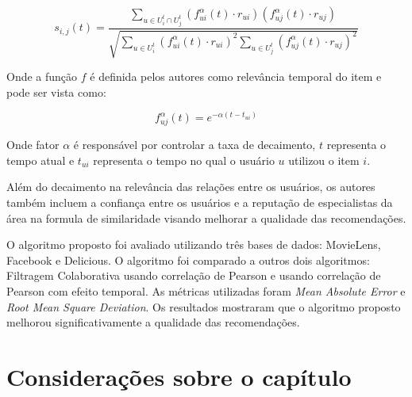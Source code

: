 \begin{equation}
  s_{i,j}(t) = \frac{\sum_{u \in U_i^t \cap U_j^t}{(f_{ui}^\alpha(t) \cdot r_{ui})(f_{uj}^\alpha(t) \cdot r_{uj})}}{\sqrt{\sum_{u \in U_i^t}{(f_{ui}^\alpha(t) \cdot r_{ui})}^2 \sum_{u \in U_j^t}{(f_{uj}^\alpha(t) \cdot r_{uj})}^2}}
  \label{eq:wei-similaridade}
\end{equation}

Onde a função $f$ é definida pelos autores como relevância temporal do item e pode ser vista como:

\begin{equation}
  f_{uj}^\alpha(t) = e^{- \alpha (t - t_{ui})}
  \label{eq:wei-relevancia-temporal}
\end{equation}

Onde fator $\alpha$ é responsável por controlar a taxa de decaimento, $t$ representa o tempo atual e $t_{ui}$ representa
o tempo no qual o usuário $u$ utilizou o item $i$.

Além do decaimento na relevância das relações entre os usuários, os autores também incluem a confiança entre os
usuários e a reputação de especialistas da área na formula de similaridade visando melhorar a qualidade das
recomendações.

O algoritmo proposto foi avaliado utilizando três bases de dados: MovieLens, Facebook e Delicious. O algoritmo foi
comparado a outros dois algoritmos: Filtragem Colaborativa usando correlação de Pearson e usando correlação de Pearson
com efeito temporal. As métricas utilizadas foram \textit{Mean Absolute Error} e \textit{Root Mean Square Deviation}.
Os resultados mostraram que o algoritmo proposto melhorou significativamente a qualidade das recomendações.

\section{Considerações sobre o capítulo}
